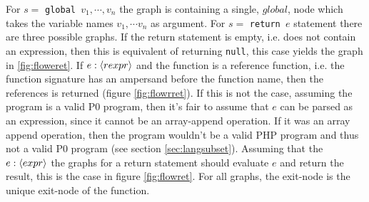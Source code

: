 \begin{figure}
{\begin{adjustbox}{max size={.25\textwidth}{.25\textheight}}
\end{adjustbox}}\hfill%
\hspace*{\fill}
\end{figure}

For $s =$ \texttt{global $v_1,\cdots, v_n$} the graph is containing a single, $global$, node which takes the variable names $v_1,\cdots v_n$ as argument. For $s =$ \texttt{return $e$} statement there are three possible graphs. If the return statement is empty, i.e. does not contain an expression, then this is equivalent of returning \texttt{null}, this case yields the graph in \ref{fig:floweret}. If $e : \langle rexpr\rangle$ and the function is a reference function, i.e. the function signature has an ampersand before the function name, then the references is returned (figure \ref{fig:flowrret}). If this is not the case, assuming the program is a valid P0 program, then it's fair to assume that $e$ can be parsed as an expression, since it cannot be an array-append operation. If it was an array append operation, then the program wouldn't be a valid PHP program and thus not a valid P0 program (see section \ref{sec:langsubset}). Assuming that the $e : \langle expr\rangle$ the graphs for a return statement should evaluate $e$ and return the result, this is the case in figure \ref{fig:flowret}. For all graphs, the exit-node is the unique exit-node of the function.

